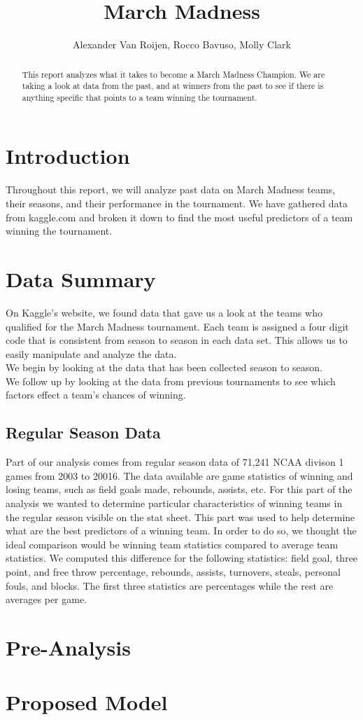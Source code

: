\documentclass[]{scrartcl}
\title{March Madness}
\author{Alexander Van Roijen, Rocco Bavuso, Molly Clark}
\begin{document}
\maketitle

\begin{abstract}
This report analyzes what it takes to become a March Madness Champion. We are taking a look at data from the past, and at winners from the past to see if there is anything specific that points to a team winning the tournament.
\end{abstract}

\section*{Introduction}
Throughout this report, we will analyze past data on March Madness teams, their seasons, and their performance in the tournament. We have gathered data from kaggle.com and broken it down to find the most useful predictors of a team winning the tournament.
\section*{Data Summary}
On Kaggle's website, we found data that gave us a look at the teams who qualified for the March Madness tournament. Each team is assigned a four digit code that is consistent from season to season in each data set. This allows us to easily manipulate and analyze the data.\\

We begin by looking at the data that has been collected season to season.\\

We follow up by looking at the data from previous tournaments to see which factors effect a team's chances of winning.\\
\subsection*{Regular Season Data}
Part of our analysis comes from regular season data of 71,241 NCAA divison 1 games from 2003 to 20016. The data available are game statistics of winning and losing teams, such as field goals made, rebounds, assists, etc. For this part of the analysis we wanted to determine particular characteristics of winning teams in the regular season visible on the stat sheet. This part was used to help determine what are the best predictors of a winning team. In order to do so, we thought the ideal comparison would be winning team statistics compared to average team statistics. We computed this difference for the following statistics: field goal, three point, and free throw percentage, rebounds, assists, turnovers, steals, personal fouls, and blocks. The first three statistics are percentages while the rest are averages per game.  
\section*{Pre-Analysis}
\section*{Proposed Model}
\end{document}
